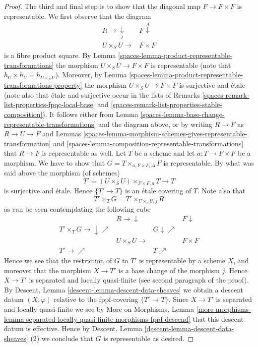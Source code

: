 \begin{proof}
\medskip\noindent
The third and final step is to show that the diagonal map $F \to F \times F$
is representable. We first observe that the diagram
$$
\begin{array}{cc}R \longrightarrow\underset{j}{\downarrow} & F \overset{\Delta}{\downarrow} \\ U \times_S U \longrightarrow & F \times F\end{array}
$$
is a fibre product square. By
Lemma \ref{spaces-lemma-product-representable-transformations} the morphism
$U \times_S U \to F \times F$ is representable (note that
$h_U \times h_U = h_{U \times_S U}$). Moreover, by
Lemma \ref{spaces-lemma-product-representable-transformations-property}
the morphism $U \times_S U \to F \times F$ is surjective
and \'etale (note also that \'etale and surjective occur in the lists of
Remarks \ref{spaces-remark-list-properties-fpqc-local-base}
and \ref{spaces-remark-list-properties-stable-composition}).
It follows either from
Lemma \ref{spaces-lemma-base-change-representable-transformations}
and the diagram above, or by writing $R \to F$ as $R \to U \to F$ and
Lemmas
\ref{spaces-lemma-morphism-schemes-gives-representable-transformation} and
\ref{spaces-lemma-composition-representable-transformations} that
$R \to F$ is representable as well. Let $T$ be a scheme and let
$a : T \to F \times F$ be a morphism. We have to show that
$G = T \times_{a, F \times F, \Delta} F$ is representable.
By what was said above the morphism (of schemes)
$$
T' = (U \times_S U) \times_{F \times F, a} T \longrightarrow T
$$
is surjective and \'etale. Hence $\{T' \to T\}$ is an \'etale
covering of $T$. Note also that
$$
T' \times_T G = T' \times_{U \times_S U, j} R
$$
as can be seen contemplating the following cube
$$
\begin{array}{cccc} & R \longrightarrow\downarrow &  & F \downarrow \\ T' \times_T G \longrightarrow\downarrow\nearrow &  & G \downarrow\nearrow &  \\  & U \times_S U \longrightarrow &  & F \times F \\ T' \longrightarrow\nearrow &  & T \nearrow & \end{array}
$$
Hence we see that the restriction of $G$ to $T'$ is representable
by a scheme $X$, and moreover that the morphism $X \to T'$ is
a base change of the morphism $j$. Hence $X \to T'$ is
separated and locally quasi-finite (see second paragraph of the proof).
By Descent, Lemma \ref{descent-lemma-descent-data-sheaves}
we obtain a descent datum $(X, \varphi)$ relative
to the fppf-covering $\{T' \to T\}$. Since
$X \to T'$ is separated and locally quasi-finite we see by
More on Morphisms, Lemma
\ref{more-morphisms-lemma-separated-locally-quasi-finite-morphisms-fppf-descend}
that this descent datum is effective.
Hence by
Descent, Lemma \ref{descent-lemma-descent-data-sheaves} (2)
we conclude that $G$ is representable as desired.
\end{proof}

